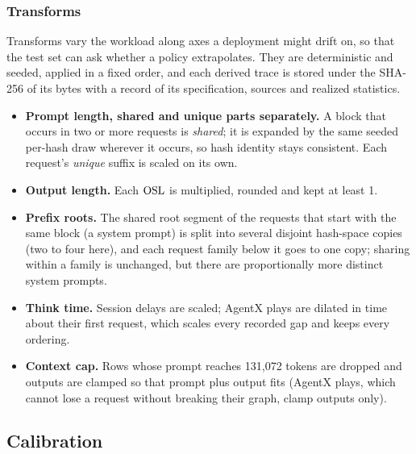 \subsubsection{Transforms}

Transforms vary the workload along axes a deployment might drift on, so that the test set can ask
whether a policy extrapolates. They are deterministic and seeded, applied in a fixed order, and
each derived trace is stored under the SHA-256 of its bytes with a record of its specification,
sources and realized statistics.
\begin{itemize}
  \item \textbf{Prompt length, shared and unique parts separately.} A block that occurs in two or
    more requests is \emph{shared}; it is expanded by the same seeded per-hash draw wherever it
    occurs, so hash identity stays consistent. Each request's \emph{unique} suffix is scaled
    on its own.
  \item \textbf{Output length.} Each $\mathrm{OSL}$ is multiplied, rounded and kept at least 1.
  \item \textbf{Prefix roots.} The shared root segment of the requests that start with the same
    block (a system prompt) is split into several disjoint hash-space copies (two to four here),
    and each request family below it goes to one copy; sharing within a family is unchanged, but
    there are proportionally more distinct system prompts.
  \item \textbf{Think time.} Session delays are scaled; AgentX plays are dilated in time about
    their first request, which scales every recorded gap and keeps every ordering.
  \item \textbf{Context cap.} Rows whose prompt reaches 131,072 tokens are dropped and outputs
    are clamped so that prompt plus output fits (AgentX plays, which cannot lose a request
    without breaking their graph, clamp outputs only).
\end{itemize}

\subsection{Calibration}
\label{app:calibration}

